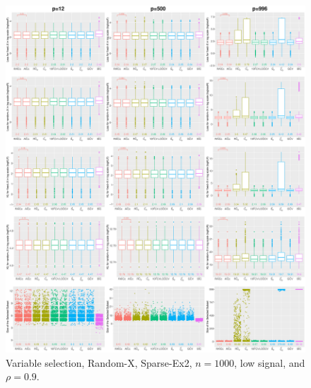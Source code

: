 \begin{figure}[!ht]
\centering
\includegraphics[width=\textwidth]{figures/supplement/randomx/subset_selection/Sparse-Ex2_n1000_lsnr_rho09.eps}
\caption{Variable selection, Random-X, Sparse-Ex2, $n=1000$, low signal, and $\rho=0.9$.}
\end{figure}
\clearpage
